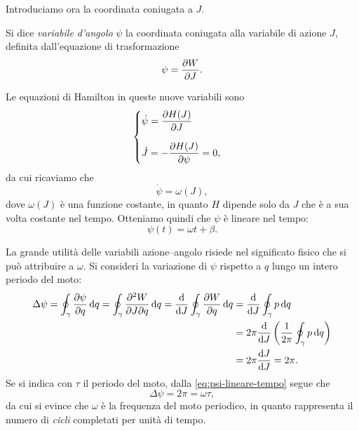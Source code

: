 Introduciamo ora la coordinata coniugata a $J$.
\begin{definition}
    Si dice \emph{variabile d'angolo} $\psi$ la coordinata coniugata alla variabile di azione $J$, definita dall'equazione di trasformazione
    \begin{equation*}
        \psi = \pdv{W}{J}.
    \end{equation*}
\end{definition}
Le equazioni di Hamilton in queste nuove variabili sono
\begin{equation*}
    \begin{cases}
        \displaystyle \dot{\psi} = \pdv{H(J)}{J} \\[0.5cm]
        \displaystyle \dot{J} = -\pdv{H(J)}{\psi} = 0,
    \end{cases}
\end{equation*}
da cui ricaviamo che
\begin{equation*}
    \dot{\psi} = \omega(J),
\end{equation*}
dove $\omega(J)$ è una funzione costante, in quanto $H$ dipende solo da $J$ che è a sua volta costante nel tempo. Otteniamo quindi che $\psi$ è lineare nel tempo:
\begin{equation} \label{eq:psi-lineare-tempo}
    \psi(t) = \omega t + \beta.
\end{equation}

La grande utilità delle variabili azione--angolo risiede nel significato fisico che si può attribuire a $\omega$. Si consideri la variazione di $\psi$ rispetto a $q$ lungo un intero periodo del moto:
\begin{align*}
    \Delta \psi = \oint_\gamma \pdv{\psi}{q} \dd{q} = \oint_\gamma \pdv{W}{J}{q} \dd{q} = \dv{J}\oint_\gamma \pdv{W}{q} \dd{q} &= \dv{J}\oint_\gamma p \dd{q} \\
    &= 2\pi \dv{J}\left(\frac{1}{2\pi} \oint_\gamma p\dd{q}\right) \\
    &= 2\pi \dv{J}{J} = 2\pi.
\end{align*}
Se si indica con $\tau$ il periodo del moto, dalla \eqref{eq:psi-lineare-tempo} segue che
\begin{equation*}
    \Delta \psi = 2\pi = \omega \tau,
\end{equation*}
da cui si evince che $\omega$ è la frequenza del moto periodico, in quanto rappresenta il numero di \emph{cicli} completati per unità di tempo.

